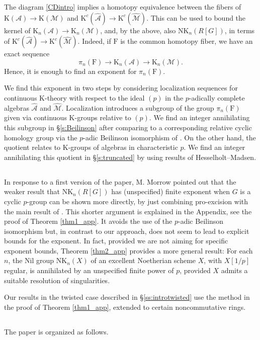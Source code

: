 \documentclass[reqno,11pt,letterpaper]{amsart}
\theoremstyle{plain}
\numberwithin{equation}{subsection}
\theoremstyle{remark}
\theoremstyle{plain}
\theoremstyle{definition}\newtheorem*{notation}{Notation}
\newcommand{\A}{{\mathcal A}}
\newcommand{\M}{{\mathcal M}}
\newcommand{\RK}{\mathrm{K}}
\newcommand{\RF}{\mathrm{F}}
\newcommand{\RNK}{\mathrm{NK}}
\newcommand{\wh}{\widehat}
\begin{document}
The diagram \eqref{CDintro} implies a homotopy equivalence 
between the fibers of $\RK(\A) \to  \RK(\M)$ and $\RK^c(\wh \A) \to  \RK^c(\wh\M)$.  
This can be used to bound the kernel of $\RK_n(\A)\to \RK_n(\M)$, and, by the above, also $\RNK_n(R[G])$, in terms of $\RK^c(\wh \A) \to  \RK^c(\wh\M)$.
Indeed, if $\RF$ is the common homotopy fiber, we have an exact sequence
\[
\pi_n(\RF)\to \RK_n(\A)\to \RK_n(\M).
\]
 Hence, it is enough to find an exponent  for $\pi_n(\RF)$.
 
 We find  this exponent in two steps by considering localization sequences for continuous $\RK$-theory with respect to the ideal $(p)$ in the $p$-adically complete algebras $\wh \A$ and $\wh \M$.  Localization introduces  a subgroup of the group $\pi_n(\RF)$ given via continuous $\RK$-groups   relative to $(p)$. We find an integer annihilating this subgroup in \S \ref{s:Beilinson} after comparing to a corresponding relative cyclic homology group via the $p$-adic Beilinson isomorphism of \cite{NikolausBFSq}. On the other hand, the quotient relates to $\RK$-groups of algebras in characteristic $p$.  We find an integer annihilating this quotient in \S \ref{s:truncated} by using results of Hesselholt--Madsen. 
 
\subsection{}   In response to a first version of the paper,  M. Morrow pointed out that the weaker result that $\RNK_n(R[G])$ has (unspecified) finite exponent when $G$ is a cyclic $p$-group can be shown more directly, by just combining pro-excision with the main result of \cite{GH2}. This shorter argument is explained in the Appendix, see the proof of Theorem \ref{thm1_app}.
It avoids the use of the $p$-adic Beilinson isomorphism but, in contrast to our approach, does not seem to lead to explicit bounds for the exponent. In fact, provided we are not aiming for specific exponent bounds, Theorem \ref{thm2_app}  provides a more general result: For each $n$, the Nil group $\RNK_n(X)$ of an excellent Noetherian scheme $X$, with $X[1/p]$ regular,
is annihilated by an unspecified finite power of $p$, provided $X$ admits a suitable resolution of singularities.

Our results in the twisted case described in \S \ref{ss:introtwisted} use the method in the proof of Theorem \ref{thm1_app}, extended to certain noncommutative rings.

 


\subsection{}   The paper is organized as follows. 
\end{document}
